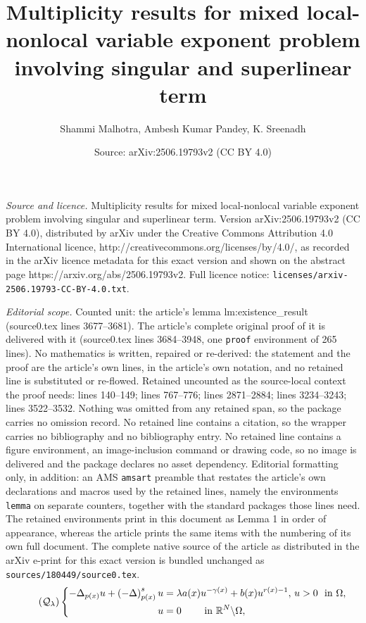 \documentclass[10pt,a4paper]{amsart}
\title{Multiplicity results for mixed local-nonlocal variable exponent problem involving singular and superlinear term}
\author{Shammi Malhotra, Ambesh Kumar Pandey, K. Sreenadh}
\date{Source: arXiv:2506.19793v2 (CC BY 4.0)}
\newcommand{\De} {\Delta}
\newcommand{\lb}{\left(}
\newcommand{\om} {\Omega}
\newcommand{\rb}{\right)}
\newcommand{\rnn}{\mathbb{R}^{N}}
\begin{document}
\maketitle

\noindent\emph{Source and licence.} Multiplicity results for mixed local-nonlocal variable exponent problem involving singular and superlinear term. Version arXiv:2506.19793v2 (CC BY 4.0), distributed by arXiv under the Creative Commons Attribution 4.0 International licence, http://creativecommons.org/licenses/by/4.0/, as recorded in the arXiv licence metadata for this exact version and shown on the abstract page https://arxiv.org/abs/2506.19793v2. Full licence notice: \texttt{licenses/arxiv-2506.19793-CC-BY-4.0.txt}.\par\smallskip

\noindent\textit{Editorial scope.} Counted unit: the article's lemma lm:existence\_result (source0.tex lines 3677--3681). The article's complete original proof of it is delivered with it (source0.tex lines 3684--3948, one \texttt{proof} environment of 265 lines). No mathematics is written, repaired or re-derived: the statement and the proof are the article's own lines, in the article's own notation, and no retained line is substituted or re-flowed.  Retained uncounted as the source-local context the proof needs: lines 140--149; lines 767--776; lines 2871--2884; lines 3234--3243; lines 3522--3532.  Nothing was omitted from any retained span, so the package carries no omission record.  No retained line contains a citation, so the wrapper carries no bibliography and no bibliography entry.  No retained line contains a figure environment, an image-inclusion command or drawing code, so no image is delivered and the package declares no asset dependency.  Editorial formatting only, in addition: an AMS \texttt{amsart} preamble that restates the article's own declarations and macros used by the retained lines, namely the environments \texttt{lemma} on separate counters, together with the standard packages those lines need.  The retained environments print in this document as Lemma 1 in order of appearance, whereas the article prints the same items with the numbering of its own full document.  The complete native source of the article as distributed in the arXiv e-print for this exact version is bundled unchanged as \texttt{sources/180449/source0.tex}.
	\begin{equation}\label{eq1}\tag{$\mathcal{Q}_{\lambda}$}
   \left\{
	\begin{aligned}
		-\De_{p(x)}u+\lb -\De\rb^s_{p(x)}u 
&=\lambda a(x)u^{-\gamma(x)}+b(x)u^{r(x)-1},\,
u>0 \ \text{ in } \om,\\
u &= 0 \qquad \text{ in } \rnn\backslash\om,
	\end{aligned}
    \right.
\end{equation}
\end{document}
